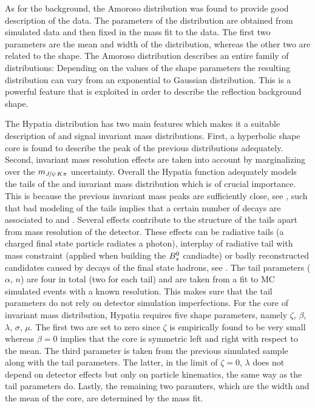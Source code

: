 As for the \LbJpsippi background, the Amoroso distribution was found to provide  good description of the data.
The parameters of the distribution are obtained from simulated data and then fixed in the mass fit to the data. The first two parameters
are the mean and width of the distribution, whereas the other two are related to the shape. The Amoroso distribution describes
an entire family of distributions: Depending on the values of the shape parameters the resulting distribution can vary from an exponential
to Gaussian distribution. This is a powerful feature that is exploited in order to describe the \LbJpsippi reflection background shape.

The Hypatia distribution has two main features which makes it a suitable description of \Bs and \Bd signal invariant mass distributions.
First, a hyperbolic shape core is found to describe the peak of the previous distributions adequately. Second, invariant mass resolution
effects are taken into account by marginalizing over the $m_{{J\mskip -3mu/\mskip -2mu\psi\mskip 2mu} K\pi}$ uncertainty. Overall the Hypatia function adequately
models the tails of the \Bs and \Bd invariant mass distribution which is of crucial importance. This is because the previous invariant
mass peaks are sufficiently close, see , such that bad modeling of the tails implies that a certain number of \Bd decays
are associated to \Bs and \viceversa. Several effects contribute to the structure of the tails apart
from mass resolution of the detector. These effects can be radiative tails (a charged final state particle radiates a photon), interplay of
radiative tail with \jpsi mass constraint (applied when building the $B^0_s$ candiadte) or badly reconstructed candidates caused by decays of the final state hadrons, see \cite{Santos:2013gra}.
The tail parameters ($\alpha$, $n$) are four in total (two for each tail) and are taken from a fit to MC simulated events with a known resolution.
This makes sure that the tail parameters do not rely on detector simulation imperfections.
For the core of invariant mass distribution, Hypatia requires five shape parameters, namely $\zeta$, $\beta$, $\lambda$, $\sigma$, $\mu$.
The first two are set to zero since $\zeta$ is empirically found to be very small whereas $\beta = 0$ implies that the core is
symmetric left and right with respect to the mean. The third parameter is taken from the previous simulated sample along
with the tail parameters. The latter, in the limit of $\zeta = 0$, $\lambda$ does not depend on detector effects but only
on particle kinematics, the same way as the tail parameters do. Lastly, the remaining two paramters, which are the width and
the mean of the core, are determined by the mass fit.

